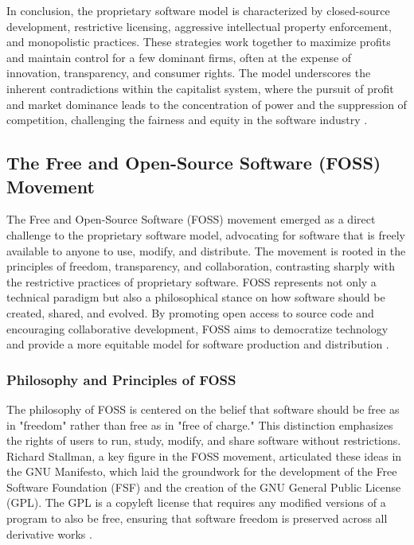 \begin{refsection}
In conclusion, the proprietary software model is characterized by closed-source development, restrictive licensing, aggressive intellectual property enforcement, and monopolistic practices. These strategies work together to maximize profits and maintain control for a few dominant firms, often at the expense of innovation, transparency, and consumer rights. The model underscores the inherent contradictions within the capitalist system, where the pursuit of profit and market dominance leads to the concentration of power and the suppression of competition, challenging the fairness and equity in the software industry \cite[pp.~1-25]{marx2008}.

\subsection{The Free and Open-Source Software (FOSS) Movement}

The Free and Open-Source Software (FOSS) movement emerged as a direct challenge to the proprietary software model, advocating for software that is freely available to anyone to use, modify, and distribute. The movement is rooted in the principles of freedom, transparency, and collaboration, contrasting sharply with the restrictive practices of proprietary software. FOSS represents not only a technical paradigm but also a philosophical stance on how software should be created, shared, and evolved. By promoting open access to source code and encouraging collaborative development, FOSS aims to democratize technology and provide a more equitable model for software production and distribution \cite[pp.~3-9]{stallman2010}.

\subsubsection{Philosophy and Principles of FOSS}

The philosophy of FOSS is centered on the belief that software should be free as in "freedom" rather than free as in "free of charge." This distinction emphasizes the rights of users to run, study, modify, and share software without restrictions. Richard Stallman, a key figure in the FOSS movement, articulated these ideas in the GNU Manifesto, which laid the groundwork for the development of the Free Software Foundation (FSF) and the creation of the GNU General Public License (GPL). The GPL is a copyleft license that requires any modified versions of a program to also be free, ensuring that software freedom is preserved across all derivative works \cite[pp.~12-17]{stallman2010}.


\end{refsection}
